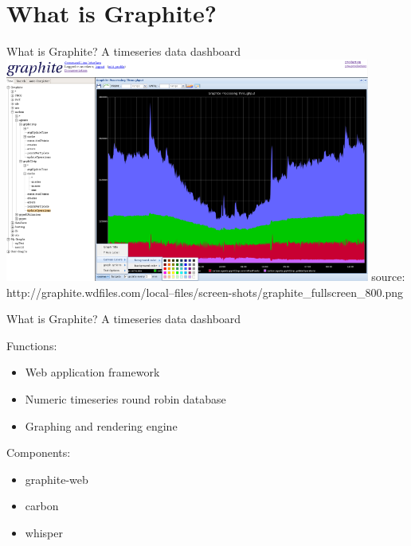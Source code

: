 \documentclass[smaller]{beamer} %
\begin{document}
\section{What is Graphite?}
\begin{frame}[fragile]{What is Graphite?}
    A timeseries data dashboard
    \vskip10pt
    \includegraphics[width=0.9\textwidth,height=0.9\textheight,keepaspectratio]{img/Screenshot.png}
    \vskip10pt
    source:  http://graphite.wdfiles.com/local--files/screen-shots/graphite\_fullscreen\_800.png
\end{frame}

\begin{frame}{What is Graphite?}
    A timeseries data dashboard
    \vskip10pt

    Functions:
    \begin{itemize}
        \item Web application framework
        \item Numeric timeseries round robin database
        \item Graphing and rendering engine
    \end{itemize}

    \vskip10pt
    Components:
    \begin{itemize}
        \item graphite-web
        \item carbon
        \item whisper
    \end{itemize}
\end{frame}
\end{document}
